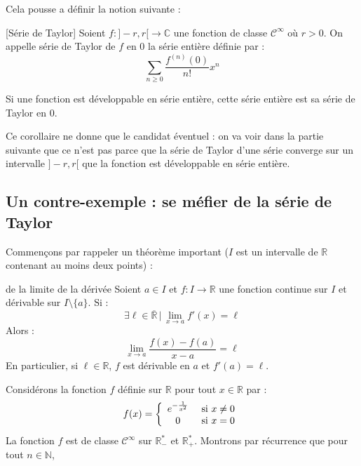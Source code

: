 \documentclass[french,11pt,twoside]{VcCours}
\begin{document}
\medskip

Cela pousse a définir la notion suivante :

\begin{Definition}{}[Série de Taylor]
Soient $f : ]-r,r[ \rightarrow \mathbb{C}$ une fonction de classe $\mathcal{C}^{\infty}$ où $r>0$. On appelle série de Taylor de $f$ en $0$ la série entière définie par :
$$ \sum_{n \geq 0} \frac{f^{(n)}(0)}{n!} x^n$$
\end{Definition}

\begin{Corollaire}{} Si une fonction est développable en série entière, cette série entière est sa série de Taylor en $0$.
\end{Corollaire}

\begin{Remarque}[\alerte]{} Ce corollaire ne donne que le candidat éventuel : on va voir dans la partie suivante que ce n'est pas parce que la série de Taylor d'une série converge sur un intervalle $]-r,r[$ que la fonction est développable en série entière.
\end{Remarque}

\subsection{Un contre-exemple : se méfier de la série de Taylor}

Commençons par rappeler un théorème important ($I$ est un intervalle de $\mathbb{R}$ contenant au moins deux points) :

\begin{Theoreme}{de la limite de la dérivée} Soient $a \in I$ et $f : I \rightarrow \mathbb{R}$ une fonction continue sur $I$ et dérivable sur $I \setminus \lbrace a \rbrace$. Si :
$$ \exists \ell \in \overline{\mathbb{R}} \, \vert \, \lim_{x \rightarrow a} f'(x) = \ell$$
Alors :
$$ \lim_{x \rightarrow a } \dfrac{f(x)-f(a)}{x-a} = \ell$$
En particulier, si $\ell \in \mathbb{R}$, $f$ est dérivable en $a$ et $f'(a)= \ell$.
\end{Theoreme}

Considérons la fonction $f$ définie sur $\mathbb{R}$ pour tout $x \in \mathbb{R}$ par :
$$ f(x) = \left\lbrace \begin{array}{cl}
e^{- \frac{1}{x^2} } & \hbox{ si } x \neq 0 \\
0 & \hbox{ si } x=0\\
\end{array}\right.$$
La fonction $f$ est de classe $\mathcal{C}^{\infty}$ sur $\mathbb{R}_{-}^{*}$ et $\mathbb{R}_{+}^{*}$. Montrons par récurrence que pour tout $n \in \mathbb{N}$,
\end{document}
